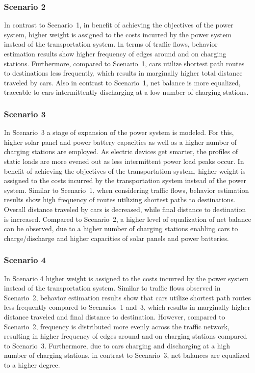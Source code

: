 \subsubsection*{Scenario 2}

In contrast to Scenario~1, in benefit of achieving the objectives of the power system, higher weight is assigned to the costs incurred by the power system instead of the transportation system. In terms of traffic flows, behavior estimation results show higher frequency of edges around and on charging stations. Furthermore, compared to Scenario~1, cars utilize shortest path routes to destinations less frequently, which results in marginally higher total distance traveled by cars. Also in contrast to Scenario~1, net balance is more equalized, traceable to cars intermittently discharging at a low number of charging stations.

\subsubsection*{Scenario 3}

In Scenario~3 a stage of expansion of the power system is modeled. For this, higher solar panel and power battery capacities as well as a higher number of charging stations are employed. As electric devices get smarter, the profiles of static loads are more evened out as less intermittent power load peaks occur. In benefit of achieving the objectives of the transportation system, higher weight is assigned to the costs incurred by the transportation system instead of the power system. Similar to Scenario~1, when considering traffic flows, behavior estimation results show high frequency of routes utilizing shortest paths to destinations. Overall distance traveled by cars is decreased, while final distance to destination is increased. Compared to Scenario~2, a higher level of equalization of net balance can be observed, due to a higher number of charging stations enabling cars to charge/discharge and higher capacities of solar panels and power batteries.

\subsubsection*{Scenario 4}

In Scenario 4 higher weight is assigned to the costs incurred by the power system instead of the transportation system. Similar to traffic flows observed in Scenario~2, behavior estimation results show that cars utilize shortest path routes less frequently compared to Scenarios~1 and~3, which results in marginally higher distance traveled and final distance to destination. However, compared to Scenario~2, frequency is distributed more evenly across the traffic network, resulting in higher frequency of edges around and on charging stations compared to Scenario~3. Furthermore, due to cars charging and discharging at a high number of charging stations, in contrast to Scenario~3, net balances are equalized to a higher degree.